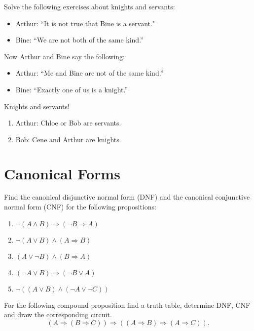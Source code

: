 \documentclass[11pt,paper=b5,footinclude,headinclude]{scrbook} %
\theoremstyle{remark}
\theoremstyle{definition} %
\theoremstyle{theorem} %
\newtheorem{ex}{Exercise\hypertarget{sol:\theex}}[chapter]
\begin{document}
\begin{ex} Solve the following exercises about knights and servants:
\begin{itemize}
  \item Arthur: ``It is not true that Bine is a servant."
  \item Bine: ``We are not both of the same kind.''
\end{itemize}




\end{ex} 
\begin{ex} 
Now Arthur and Bine say the following:
\begin{itemize}
 \item Arthur: ``Me and Bine are not of the same kind.''
 \item Bine: ``Exactly one of us is a knight.''
\end{itemize}


\end{ex} 
\begin{ex} Knights and servants! 
\begin{enumerate}

\item Arthur: Chloe or Bob are servants.
\item 
Bob: Cene and Arthur are knights.
\end{enumerate}
\end{ex}



\section{Canonical Forms}
     \begin{ex} Find the canonical disjunctive normal form (DNF) and the canonical conjunctive normal form (CNF) for the following propositions:
    \begin{enumerate}[label=(\roman*)]
        \item $\neg(A \land B) \Rightarrow (\neg B \Rightarrow A)$
        \item $\neg(A \lor B) \land (A \Rightarrow B)$
        \item \((A \lor \neg B) \land (B \Rightarrow A)\)
    \item \((\neg A \lor B) \Rightarrow (\neg B \lor A)\)
    \item \(\neg((A \lor B) \land (\neg A \lor \neg C))\)
    \end{enumerate}

\end{ex}
\begin{ex} For the following compound proposition find  a truth table, determine DNF, CNF and draw the corresponding circuit.
$$
(A \Rightarrow (B\Rightarrow C)) \Rightarrow ((A\Rightarrow B)\Rightarrow (A \Rightarrow C)).
$$
\end{ex}
\end{document}
